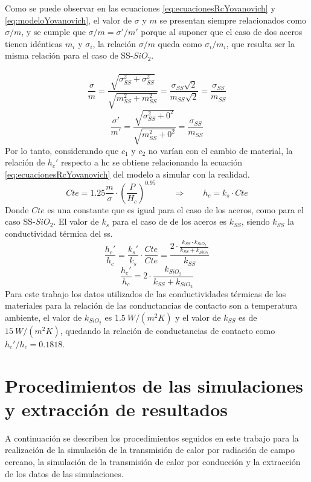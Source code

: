 Como se puede observar en las ecuaciones \ref{eq:ecuacionesRcYovanovich} y \ref{eq:modeloYovanovich}, el valor de $\sigma$ y $m$ se presentan siempre relacionados como $\sigma / m$, y se cumple que $\sigma /m =\sigma ' / m'$ porque al suponer que el caso de dos aceros tienen idénticas $m_i$ y $\sigma_i$, la relación $\sigma / m$ queda como $\sigma_i / m_i$, que resulta ser la misma relación para el caso de SS-$SiO_2$.\\\\
\[ \frac{\sigma}{m}=\frac{\sqrt{\sigma_{SS}^2+\sigma_{SS}^2}}{\sqrt{m_{SS}^2+m_{SS}^2}}=\frac{\sigma_{SS}\sqrt{2}}{m_{SS}\sqrt{2}} =\frac{\sigma_{SS}}{m_{SS}}\]
\[ \frac{\sigma'}{m'}=\frac{\sqrt{\sigma_{SS}^2+0^2}}{\sqrt{m_{SS}^2+0^2}}=\frac{\sigma_{SS}}{m_{SS}} \]
Por lo tanto, considerando que $c_1$ y $c_2$ no varían con el cambio de material, la relación de $h_c'$ respecto a \gls{hc} se obtiene relacionando la ecuación \eqref{eq:ecuacionesRcYovanovich} del modelo a simular con la realidad.
\[Cte=1.25\frac{m}{\sigma}\cdot \left(\dfrac{P}{H_c}\right)^{0.95} \qquad \Longrightarrow \qquad h_c=k_s\cdot Cte\]
Donde $Cte$ es una constante que es igual para el caso de los aceros, como para el caso SS-$SiO_2$. El valor de $k_s$ para el caso de de los aceros es $k_{SS}$, siendo $k_{SS}$ la conductividad térmica del \acrshort{ss}. 
\[ \frac{h_c'}{h_c}=\frac{k_s'}{k_s}\cdot \frac{Cte}{Cte}=\frac{2 \cdot \frac{k_{SS}\cdot k_{SiO_2}}{k_{SS}+k_{SiO_2}}}{k_{SS}}\]
\begin{equation}
\frac{h_c'}{h_c}=2\cdot \frac{k_{SiO_2}}{k_{SS}+k_{SiO_2}}
\label{eq:relacion_conductividadesTermicas}
\end{equation}
Para este trabajo los datos utilizados de las conductividades térmicas de los materiales para la relación de las conductancias de contacto son a temperatura ambiente, el valor de $k_{SiO_2}$ es $1.5 \ W/\left( m^2 K\right)$ y el valor de $k_{SS}$ es de $15 \ W/\left( m^2 K\right)$, quedando la relación de conductancias de contacto como ${h_c'}/{h_c}=0.1818$.

\section{Procedimientos de las simulaciones y extracción de resultados}
A continuación se describen los procedimientos seguidos en este trabajo para la realización de la simulación de la transmisión de calor por radiación de campo cercano, la simulación de la transmisión de calor por conducción y la extracción de los datos de las simulaciones.\\
